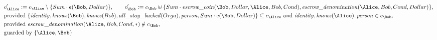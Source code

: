 \begin{align*}
&
c'_
{
\Alice
}
 := 
c_
{
\Alice
}
 \setminus 
\{
Sum
\cdot
\text{\textcent}
(
\Bob
,
Dollar
)
\}
, \qquad 
c'_
{
\Bob
}
 := 
c_
{
\Bob
}
 \uplus 
\{
Sum
\cdot
\mathit{\detokenize{
escrow_coin
}}
(
\Bob
,
Dollar
,
\Alice
,
Bob
,
Cond
)
,
\mathit{\detokenize{
escrow_denomination
}}
(
\Alice
,
Bob
,
Cond
,
Dollar
)
\}
,\\
&
\text{provided } 
\{
\mathit{\detokenize{
identity
}}
,
\mathit{\detokenize{
knows
}}
(
\Bob
)
,
\mathit{\detokenize{
knows
}}
(
Bob
)
,
\mathit{\detokenize{
all_stay_backed
}}
(
Orga
)
,
\mathit{\detokenize{
person
}}
,
Sum
\cdot
\text{\textcent}
(
\Bob
,
Dollar
)
\}
 \subseteq c_
{
\Alice
}
 \text{ and } 
\mathit{\detokenize{
identity
}}
,
\mathit{\detokenize{
knows
}}
(
\Alice
)
,
\mathit{\detokenize{
person
}}
 \in c_
{
\Bob
}
,\\
&
\text{provided } 
\mathit{\detokenize{
escrow_denomination
}}
(
\Alice
,
Bob
,
Cond
,
\ast
)
 \notin c_
{
\Bob
}
,\\
&
\text{guarded by } \{
\Alice
,
\Bob
\}
\end{align*}

